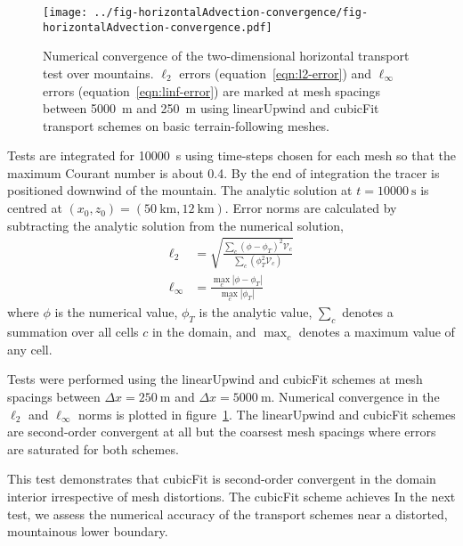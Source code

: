\begin{figure}
	\centering
	\texttt{[image: ../fig-horizontalAdvection-convergence/fig-horizontalAdvection-convergence.pdf]}
%
	\caption{Numerical convergence of the two-dimensional horizontal transport test over mountains.  $\ell_2$ errors (equation~\ref{eqn:l2-error}) and $\ell_\infty$ errors (equation~\ref{eqn:linf-error}) are marked at mesh spacings between \SI{5000}{\meter} and \SI{250}{\meter} using linearUpwind and cubicFit transport schemes on basic terrain-following meshes.}
	\label{fig:horizontalAdvection-convergence}
\end{figure}

Tests are integrated for \SI{10000}{\second} using time-steps chosen for each mesh so that the maximum Courant number is about \num{0.4}.    By the end of integration the tracer is positioned downwind of the mountain.
The analytic solution at $t = \SI{10000}{\second}$ is centred at $(x_0, z_0) = (\SI{50}{\kilo\meter}, \SI{12}{\kilo\meter})$.  Error norms are calculated by subtracting the analytic solution from the numerical solution,
\begin{align}
	\ell_2 &= \sqrt{\frac{\sum_c \left(\phi - \phi_T \right)^2 \mathcal{V}_c}{\sum_c \left(\phi_T^2 \mathcal{V}_c \right)}} \label{eqn:l2-error} \\
	\ell_\infty &= \frac{\max_c |\phi - \phi_T|}{\max_c |\phi_T|} \label{eqn:linf-error}
\end{align}
where $\phi$ is the numerical value, $\phi_T$ is the analytic value, $\sum_c$ denotes a summation over all cells $c$ in the domain, and $\max_c$ denotes a maximum value of any cell.

Tests were performed using the linearUpwind and cubicFit schemes at mesh spacings between $\Delta x = \SI{250}{\meter}$ and $\Delta x = \SI{5000}{\meter}$.
Numerical convergence in the $\ell_2$ and $\ell_\infty$ norms is plotted in figure~\ref{fig:horizontalAdvection-convergence}.
The linearUpwind and cubicFit schemes are second-order convergent at all but the coarsest mesh spacings where errors are saturated for both schemes.


This test demonstrates that cubicFit is second-order convergent in the domain interior irrespective of mesh distortions.  The cubicFit scheme achieves In the next test, we assess the numerical accuracy of the transport schemes near a distorted, mountainous lower boundary.

